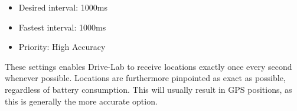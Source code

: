 \begin{itemize}
\item Desired interval: 1000ms
\item Fastest interval: 1000ms
\item Priority: High Accuracy
\end{itemize}

These settings enables Drive-Lab to receive locations exactly once every second whenever possible. Locations are furthermore pinpointed as exact as possible, regardless of battery consumption. This will usually result in GPS positions, as this is generally the more accurate option.